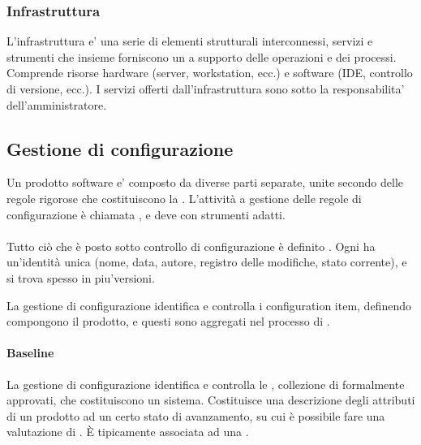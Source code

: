 \subsubsection{Infrastruttura}

L'infrastruttura e' una serie di elementi strutturali interconnessi, servizi e
strumenti che insieme forniscono un  a supporto delle
operazioni e dei processi. Comprende risorse hardware (server, workstation,
ecc.) e software (IDE, controllo di versione, ecc.). I servizi offerti
dall'infrastruttura sono sotto la responsabilita' dell'amministratore.

\subsection{Gestione di configurazione}

Un prodotto software e' composto da diverse parti separate, unite secondo delle
regole rigorose che costituiscono la . L'attività a
gestione delle regole di configurazione è chiamata
, e deve  con strumenti
adatti.

\paragraph{}
\label{par:configuration_item}

Tutto ciò che è posto sotto controllo di configurazione è definito
. Ogni  ha
un'identità unica (nome, data, autore, registro delle modifiche, stato
corrente), e si trova spesso in piu'versioni.

La gestione di configurazione identifica e controlla i configuration item,
definendo  compongono il prodotto, e  questi sono
aggregati nel processo di .

\paragraph{Baseline}
\label{par:baseline}

La gestione di configurazione identifica e controlla le ,
collezione di  formalmente approvati, che
costituiscono un sistema. Costituisce una descrizione degli attributi di un
prodotto ad un certo stato di avanzamento, su cui è possibile fare una
valutazione di . È tipicamente associata ad una
.

